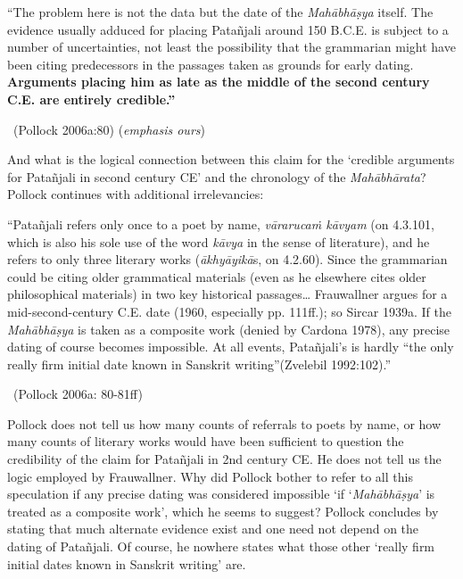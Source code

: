 \begin{myquote}
“The problem here is not the data but the date of the \textit{Mahābhāṣya} itself. The evidence usually adduced for placing Patañjali around 150 B.C.E. is subject to a number of uncertainties, not least the possibility that the grammarian might have been citing predecessors in the passages taken as grounds for early dating. \textbf{Arguments placing him as late as the middle of the second century C.E. are entirely credible.”} 

~\hfill (Pollock 2006a:80) (\textit{emphasis ours})
\end{myquote}

And what is the logical connection between this claim for the ‘credible arguments for Patañjali in second century CE’ and the chronology of the \textit{Mahābhārata}? Pollock continues with additional irrelevancies:

\begin{myquote}
“Patañjali refers only once to a poet by name, \textit{vārarucaṁ kāvyam} (on 4.3.101, which is also his sole use of the word \textit{kāvya} in the sense of literature), and he refers to only three literary works (\textit{ākhyāyikā}s, on 4.2.60). Since the grammarian could be citing older grammatical materials (even as he elsewhere cites older philosophical materials) in two key historical passages… Frauwallner argues for a mid-second-century C.E. date (1960, especially pp. 111ff.); so Sircar 1939a. If the \textit{Mahābhāṣya} is taken as a composite work (denied by Cardona 1978), any precise dating of course becomes impossible. At all events, Patañjali’s is hardly “the only really ﬁrm initial date known in Sanskrit writing”(Zvelebil 1992:102).” 

~\hfill (Pollock 2006a: 80-81ff)
\end{myquote}

Pollock does not tell us how many counts of referrals to poets by name, or how many counts of literary works would have been sufficient to question the credibility of the claim for Patañjali in 2nd century CE. He does not tell us the logic employed by Frauwallner. Why did Pollock bother to refer to all this speculation if any precise dating was considered impossible ‘if ‘\textit{Mahābhāṣya}’ is treated as a composite work’, which he seems to suggest? Pollock concludes by stating that much alternate evidence exist and one need not depend on the dating of Patañjali. Of course, he nowhere states what those other ‘really firm initial dates known in Sanskrit writing’ are.


